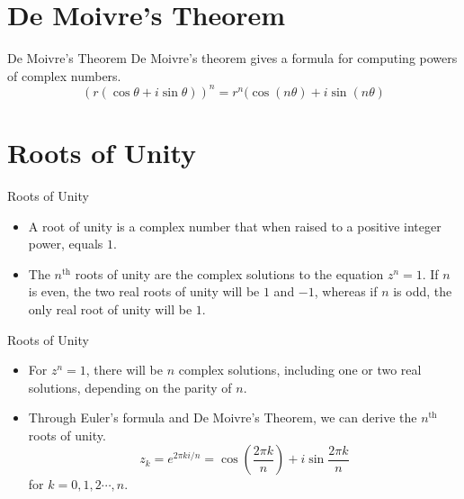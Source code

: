 \documentclass{beamer}
\begin{document}
\section{De Moivre's Theorem}
\begin{frame}{De Moivre's Theorem}
    De Moivre’s theorem gives a formula for computing powers of complex numbers.
    \begin{equation*}
        (r(\cos{\theta} + i\sin{\theta}))^n = r^n(\cos{(n\theta) + i\sin(n\theta)}
    \end{equation*}
\end{frame}

\section{Roots of Unity}
\begin{frame}{Roots of Unity}
\begin{itemize}
    \item A root of unity is a complex number that when raised to a positive integer power, equals $1$. 
    \item The $n^{\text{th}}$ roots of unity are the complex solutions to the equation $z^n = 1$. If $n$ is even, the two real roots of unity will be $1$ and $-1$, whereas if $n$ is odd, the only real root of unity will be $1$.
\end{itemize}
\end{frame}

\begin{frame}{Roots of Unity}
\begin{itemize}
    \item For $z^n = 1$, there will be $n$ complex solutions, including one or two real solutions, depending on the parity of $n$. 
    \item Through Euler's formula and De Moivre's Theorem, we can derive the $n^{\text{th}}$ roots of unity. $$z_k = e^{2\pi ki / n} = \cos{(\frac{2\pi k}{n})} + i\sin{\frac{2 \pi k}{n}}$$ for $k = 0, 1, 2 \cdots, n$.
\end{itemize}
\end{frame}
\end{document}
